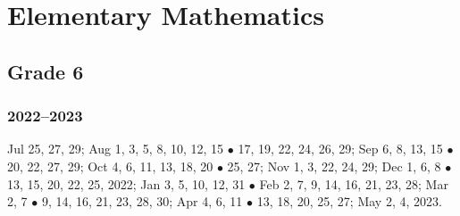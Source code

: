 \documentclass{article}
\begin{document}

\section{Elementary Mathematics}

\subsection{Grade 6}

\subsubsection{2022--2023}
Jul 25, 27, 29; Aug 1, 3, 5, 8, 10, 12, 15 $\bullet$ 17, 19, 22, 24, 26, 29; Sep 6, 8, 13, 15 $\bullet$ 20, 22, 27, 29; Oct 4, 6, 11, 13, 18, 20 $\bullet$ 25, 27; Nov 1, 3, 22, 24, 29; Dec 1, 6, 8 $\bullet$ 13, 15, 20, 22, 25, 2022; Jan 3, 5, 10, 12, 31 $\bullet$ Feb 2, 7, 9, 14, 16, 21, 23, 28; Mar 2, 7 $\bullet$ 9, 14, 16, 21, 23, 28, 30; Apr 4, 6, 11 $\bullet$ 13, 18, 20, 25, 27; May 2, 4, 2023.
\end{document}
